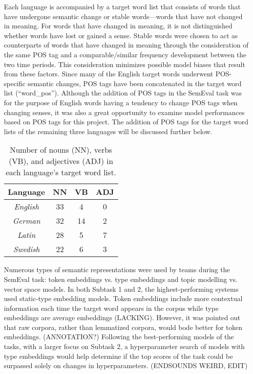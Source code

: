 Each language is accompanied by a target word list that consists of words that have undergone semantic change or stable words—words that have not changed in meaning. For words that have changed in meaning, it is not distinguished whether words have lost or gained a sense. Stable words were chosen to act as counterparts of words that have changed in meaning through the consideration of the same POS tag and a comparable/similar frequency development between the two time periods. This consideration minimizes possible model biases that result from these factors. \citep{dubossarsky-etal-2017-outta} Since many of the English target words underwent POS-specific semantic changes, POS tags have been concatenated in the target word list (“word\_pos”). Although the addition of POS tags in the SemEval task was for the purpose of English words having a tendency to change POS tags when changing senses, it was also a great opportunity to examine model performances based on POS tags for this project. The addition of POS tags for the target word lists of the remaining three languages will be discussed further below.
 
\begin{table}[h]
\small
\centering
\begin{tabular}{|c|c|c|c|}
\hline
\textbf{Language} & \textbf{NN} & \textbf{VB} & \textbf{ADJ} \\ \hline
\textit{English}                          & 33          & 4           & 0            \\ \hline
\textit{German}                           & 32          & 14          & 2            \\ \hline
\textit{Latin}                            & 28          & 5           & 7            \\ \hline
\textit{Swedish}                          & 22          & 6           & 3            \\ \hline
\end{tabular}
\caption{Number of nouns (NN), verbs (VB), and adjectives (ADJ) in each language's target word list.}
\label{tab:postag-breakdown}
\end{table}

Numerous types of semantic representations were used by teams during the SemEval task: token embeddings vs. type embeddings and topic modelling vs. vector space models. In both Subtask 1 and 2, the highest-performing systems used static-type embedding models. Token embeddings include more contextual information each time the target word appears in the corpus while type embeddings are average embeddings (LACKING). However, it was pointed out that raw corpora, rather than lemmatized corpora, would bode better for token embeddings. (ANNOTATION?) Following the best-performing models of the tasks, with a larger focus on Subtask 2, a hyperparameter search of models with type embeddings would help determine if the top scores of the task could be surpassed solely on changes in hyperparameters. (ENDSOUNDS WEIRD, EDIT) 

